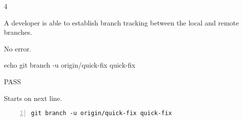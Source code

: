 \begin{description}[align=right,leftmargin=3.2cm,labelindent=3.0cm]
\item[Step:] 4
\item[Confirm:] A developer is able to establish branch tracking between the local and remote branches.
\item[Expectation:] No error.
\item[Command:] echo git  branch -u origin/quick-fix quick-fix
\item[Test Result:] PASS
\item[Evidence:] Starts on next line.
\end{description}
\begin{lstlisting}[numbers=left]
git branch -u origin/quick-fix quick-fix

\end{lstlisting}
